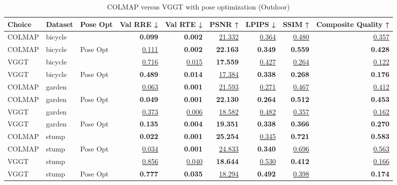 \begin{table}[H]
\caption{\ifdefined\customcaption \customcaption \else COLMAP versus VGGT with pose optimization (Outdoor) \fi}
\label{tab:04_pose_opt_outdoor}
\centering
\scriptsize
\begin{tabular}{lllrrrrrr}
\toprule
Choice & Dataset & Pose Opt & Val RRE ↓ & Val RTE ↓ & PSNR ↑ & LPIPS ↓ & SSIM ↑ & Composite Quality ↑ \\
\midrule
COLMAP & bicycle &  & \textbf{0.099} & \textbf{0.002} & \underline{21.332} & \underline{0.364} & \underline{0.480} & \underline{0.357} \\
COLMAP & bicycle & Pose Opt & \underline{0.111} & \textbf{0.002} & \textbf{22.163} & \textbf{0.349} & \textbf{0.559} & \textbf{0.428} \\
\midrule
VGGT & bicycle &  & \underline{0.716} & \underline{0.015} & \textbf{17.559} & \underline{0.427} & \underline{0.264} & \underline{0.122} \\
VGGT & bicycle & Pose Opt & \textbf{0.489} & \textbf{0.014} & \underline{17.384} & \textbf{0.338} & \textbf{0.268} & \textbf{0.176} \\
\midrule
COLMAP & garden &  & \underline{0.063} & \textbf{0.001} & \underline{21.593} & \underline{0.271} & \underline{0.467} & \underline{0.412} \\
COLMAP & garden & Pose Opt & \textbf{0.049} & \textbf{0.001} & \textbf{22.130} & \textbf{0.264} & \textbf{0.512} & \textbf{0.453} \\
\midrule
VGGT & garden &  & \underline{0.373} & \underline{0.006} & \underline{18.582} & \underline{0.482} & \underline{0.357} & \underline{0.162} \\
VGGT & garden & Pose Opt & \textbf{0.135} & \textbf{0.004} & \textbf{19.351} & \textbf{0.338} & \textbf{0.366} & \textbf{0.270} \\
\midrule
COLMAP & stump &  & \textbf{0.022} & \textbf{0.001} & \textbf{25.254} & \underline{0.345} & \textbf{0.721} & \textbf{0.583} \\
COLMAP & stump & Pose Opt & \underline{0.034} & \textbf{0.001} & \underline{24.833} & \textbf{0.340} & \underline{0.696} & \underline{0.563} \\
\midrule
VGGT & stump &  & \underline{0.856} & \underline{0.040} & \textbf{18.644} & \underline{0.530} & \textbf{0.412} & \underline{0.166} \\
VGGT & stump & Pose Opt & \textbf{0.777} & \textbf{0.035} & \underline{18.294} & \textbf{0.492} & \underline{0.398} & \textbf{0.174} \\
\bottomrule
\end{tabular}
\end{table}